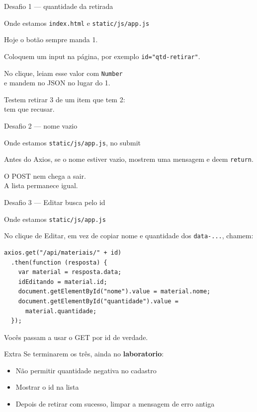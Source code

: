 \documentclass[aspectratio=169,11pt]{beamer}
\newcommand{\onde}[1]{%
  \begin{block}{Onde estamos}
    #1
  \end{block}
}
\begin{document}
\begin{frame}{Desafio 1 --- quantidade da retirada}
  \onde{\texttt{index.html} e \texttt{static/js/app.js}}

  Hoje o botão sempre manda 1.

  \vspace{0.4em}
  Coloquem um input na página, por exemplo
  \texttt{id="qtd-retirar"}.

  \vspace{0.4em}
  No clique, leiam esse valor com \texttt{Number}\\
  e mandem no JSON no lugar do 1.

  \vspace{0.4em}
  Testem retirar 3 de um item que tem 2:\\
  tem que recusar.
\end{frame}

\begin{frame}{Desafio 2 --- nome vazio}
  \onde{\texttt{static/js/app.js}, no submit}

  Antes do Axios, se o nome estiver vazio,
  mostrem uma mensagem e deem \texttt{return}.

  \vspace{0.5em}
  O POST nem chega a sair.\\
  A lista permanece igual.
\end{frame}

\begin{frame}[fragile]{Desafio 3 --- Editar busca pelo id}
  \onde{\texttt{static/js/app.js}}

  No clique de Editar, em vez de copiar nome e quantidade
  dos \texttt{data-...}, chamem:

\begin{lstlisting}[basicstyle=\ttfamily\footnotesize]
axios.get("/api/materiais/" + id)
  .then(function (resposta) {
    var material = resposta.data;
    idEditando = material.id;
    document.getElementById("nome").value = material.nome;
    document.getElementById("quantidade").value =
      material.quantidade;
  });
\end{lstlisting}

  Vocês passam a usar o GET por id de verdade.
\end{frame}

\begin{frame}{Extra}
  Se terminarem os três, ainda no \textbf{laboratorio}:

  \vspace{0.4em}
  \begin{itemize}
    \item Não permitir quantidade negativa no cadastro
    \item Mostrar o id na lista
    \item Depois de retirar com sucesso, limpar a mensagem
          de erro antiga
  \end{itemize}
\end{frame}
\end{document}
